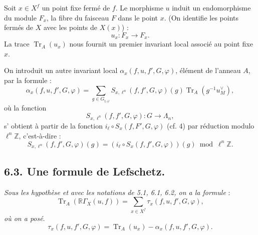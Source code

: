 \documentclass[11pt]{article}
\newcommand{\R}{\mathbb{R}}\newcommand{\RHomCore}{\mathbb{R}\mathrm{Hom}}
\providecommand{\Tr}{\operatorname{Tr}}
\providecommand{\Tr}{\operatorname{Tr}}
\providecommand{\Tr}{\operatorname{Tr}}
\providecommand{\R}{\mathrm R}
\providecommand{\Tr}{\operatorname{Tr}}
\providecommand{\RG}{\R\Gamma}
\providecommand{\La}{\Lambda}
\providecommand{\bZ}{\mathbb Z}
\providecommand{\Tr}{\operatorname{Tr}}
\begin{document}
Soit $x\in X^f$ un point fixe fermé de $f$. Le morphisme $u$ induit un endomorphisme du module $F_x$, la fibre du faisceau $F$ dans le point $x$. (On identifie les points fermés de $X$ avec les points de $X(x)$) :
\[
u_x:F_x\longrightarrow F_x .
\]
La trace $\Tr_A(u_x)$ nous fournit un premier invariant local associé au point fixe $x$.

On introduit un autre invariant local $\alpha_x(f,u,f',G,\varphi)$, élément de l'anneau $A$, par la formule :
\begin{equation}\tag{6.2.2}
\alpha_x(f,u,f',G,\varphi)=
\sum_{g\in G_{\natural,\varphi}}
S_{x,\ell^n}(f,f',G,\varphi)(g)\Tr_A(g^{-1}u_M^\vee),
\end{equation}
où la fonction
\[
S_{x,\ell^n}(f,f',G,\varphi):G\longrightarrow\La_n,
\]
s'%
obtient à partir de la fonction $i_\ell\circ S_x(f,F',G,\varphi)$ (cf. 4) par réduction modulo $\ell^n\bZ$, c'est-à-dire :%
\[
S_{x,\ell^n}(f,f',G,\varphi)(g)=
(i_\ell\circ S_x(f,f',G,\varphi))(g)\bmod \ell^n\bZ.
\]

\subsection*{6.3. Une formule de Lefschetz.}
\emph{Sous les hypothèse et avec les notations de 5.1, 6.1, 6.2, on a la formule} :
\begin{equation}
\tag{6.3.1}
\Tr_A(\RG_X(u,f))=\sum_{x\in X^f}\tau_x(f,u,f',G,\varphi),
\end{equation}
\emph{où on a posé}.
\begin{equation}
\tag{6.3.2}
\tau_x(f,u,f',G,\varphi)=\Tr_A(u_x)-\alpha_x(f,u,f',G,\varphi).
\end{equation}
\end{document}
